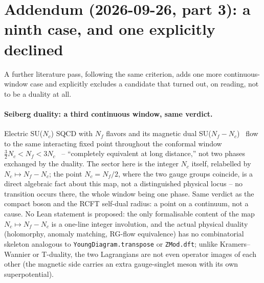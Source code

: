 \documentclass[11pt,a4paper]{article}
\newcommand{\lean}[1]{\texttt{\small #1}}
\begin{document}
\section*{Addendum (2026-09-26, part 3): a ninth case, and one explicitly declined}
A further literature pass, following the same criterion, adds one more continuous-window case and explicitly
excludes a candidate that turned out, on reading, not to be a duality at all.

\paragraph{Seiberg duality: a third continuous window, same verdict.} Electric SU($N_c$) SQCD with $N_f$ flavors
and its magnetic dual SU($N_f-N_c$)~\cite{Seiberg1994} flow to the same interacting fixed point throughout the
conformal window $\tfrac32 N_c<N_f<3N_c$~\cite{IntriligatorSeiberg1996} -- ``completely equivalent at long
distance,'' not two phases exchanged by the duality. The sector here is the integer $N_c$ itself, relabelled by
$N_c\mapsto N_f-N_c$; the point $N_c=N_f/2$, where the two gauge groups coincide, is a direct algebraic fact
about this map, not a distinguished physical locus -- no transition occurs there, the whole window being one
phase. Same verdict as the compact boson and the RCFT self-dual radius: a point on a continuum, not a cause. No
Lean statement is proposed: the only formalisable content of the map $N_c\mapsto N_f-N_c$ is a one-line integer
involution, and the actual physical duality (holomorphy, anomaly matching, RG-flow equivalence) has no
combinatorial skeleton analogous to \lean{YoungDiagram.transpose} or \lean{ZMod.dft}; unlike Kramers--Wannier or
T-duality, the two Lagrangians are not even operator images of each other (the magnetic side carries an extra
gauge-singlet meson with its own superpotential).
\end{document}

